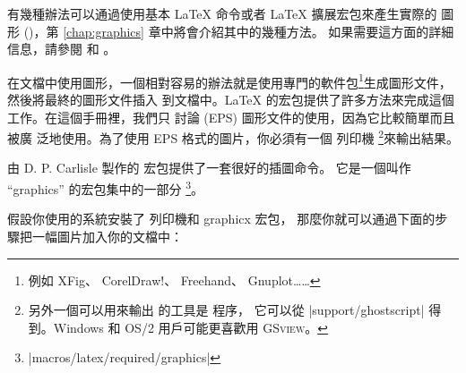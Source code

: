 有幾種辦法可以通過使用基本 \LaTeX{} 命令或者 \LaTeX{} 擴展宏包來產生實際的
圖形 ()，第 \ref{chap:graphics} 章中將會介紹其中的幾種方法。
如果需要這方面的詳細信息，請參閱 \companion{} 和 \manual{}。


在文檔中使用圖形，一個相對容易的辦法就是使用專門的軟件包\footnote{例如 XFig、
CorelDraw!、 Freehand、
Gnuplot……}生成圖形文件，然後將最終的圖形文件插入
到文檔中。\LaTeX{} 的宏包提供了許多方法來完成這個工作。在這個手冊裡，我們只
討論 \EPSi{} (EPS) 圖形文件的使用，因為它比較簡單而且被廣
泛地使用。為了使用 EPS 格式的圖片，你必須有一個 \PSi 列印機
\footnote{另外一個可以用來輸出 \PSi{} 的工具是 \textsc{} 程序，
它可以從 \CTANref|support/ghostscript| 得到。Windows 和 OS/2 
用戶可能更喜歡用 \textsc{GSview}。}來輸出結果。


由 D. P. Carlisle 製作的  宏包提供了一套很好的插圖命令。
它是一個叫作 ``graphics'' 的宏包集中的一部分
\footnote{\CTANref|macros/latex/required/graphics|}。


假設你使用的系統安裝了 \PSi{} 列印機和 \textsf{graphicx} 宏包，
那麼你就可以通過下面的步驟把一幅圖片加入你的文檔中：

